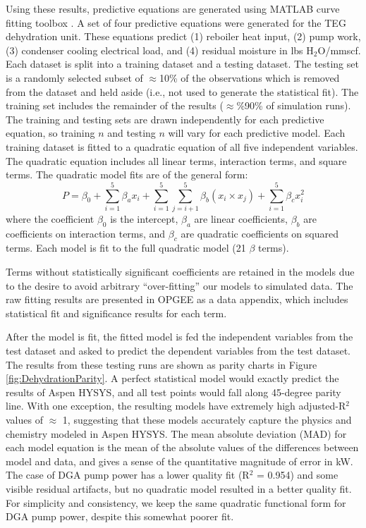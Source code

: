 \documentclass[11pt]{report}
\begin{document}
Using these results, predictive equations are generated using MATLAB curve fitting toolbox \cite{Mathworks2016}.  A set of four predictive equations were generated for the TEG dehydration unit. These equations predict (1) reboiler heat input, (2) pump work, (3) condenser cooling electrical load, and (4) residual moisture in lbs H$_2$O/mmscf. Each dataset is split into a training dataset and a testing dataset. The testing set is a randomly selected subset of $\approx$10\% of the observations which is removed from the dataset and held aside (i.e., not used to generate the statistical fit). The training set includes the remainder of the results ($\approx$\%90\% of simulation runs). The training and testing sets are drawn independently for each predictive equation, so training $n$ and testing $n$ will vary for each predictive model. Each training dataset is fitted to a quadratic equation of all five independent variables. The quadratic equation includes all linear terms, interaction terms, and square terms. The quadratic model fits are of the general form:
\begin{equation}
P 	= \beta_0 + \sum_{i=1}^{5} \beta_a x_i + \sum_{i=1}^{5} \sum_{j=i+1}^{5} \beta_b \left(x_i \times x_j\right) + \sum_{i=1}^{5} \beta_c x_i^2
\end{equation}
where the coefficient $\beta_0$ is the intercept, $\beta_a$ are linear coefficients, $\beta_b$ are coefficients on interaction terms, and $\beta_c$ are quadratic coefficients on squared terms.  Each model is fit to the full quadratic model (21 $\beta$ terms). 

Terms without statistically significant coefficients are retained in the models due to the desire to avoid arbitrary ``over-fitting'' our models to simulated data. The raw fitting results are presented in OPGEE as a data appendix, which includes statistical fit and significance results for each term.

After the model is fit, the fitted model is fed the independent variables from the test dataset and asked to predict the dependent variables from the test dataset. The results from these testing runs are shown as parity charts in Figure \ref{fig:DehydrationParity}. A perfect statistical model would exactly predict the results of Aspen HYSYS, and all test points would fall along 45-degree parity line. With one exception, the resulting models have extremely high adjusted-R$^2$ values of $\approx$ 1, suggesting that these models accurately capture the physics and chemistry modeled in Aspen HYSYS. The mean absolute deviation (MAD) for each model equation is the mean of the absolute values of the differences between model and data, and gives a sense of the quantitative magnitude of error in kW. The case of DGA pump power has a lower quality fit (R$^2$ = 0.954) and some visible residual artifacts, but no quadratic model resulted in a better quality fit. For simplicity and consistency, we keep the same quadratic functional form for DGA pump power, despite this somewhat poorer fit.
\end{document}
